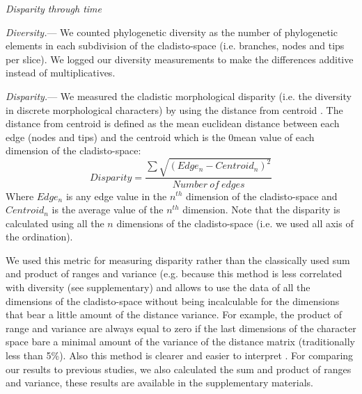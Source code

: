 \documentclass[12pt,letterpaper]{article}
\renewcommand{\subsection}[1]{%
\bigskip
\begin{center}
\begin{large}
\normalfont\itshape #1
\end{large}
\end{center}}
\renewcommand{\subsubsection}[1]{%
\vspace{2ex}
\noindent
\textit{#1.}---}
\begin{document}
\subsection{Disparity through time}
\subsubsection{Diversity}
We counted phylogenetic diversity as the number of phylogenetic elements in each subdivision of the cladisto-space (i.e. branches, nodes and tips per slice). We logged our diversity measurements to make the differences additive instead of multiplicatives.

\subsubsection{Disparity}
We measured the cladistic morphological disparity (i.e. the diversity in discrete morphological characters) by using the distance from centroid \cite{finlay2015morphological}. The distance from centroid is defined as the mean euclidean distance between each edge (nodes and tips) and the centroid which is the 0mean value of each dimension of the cladisto-space:
\begin{equation}
Disparity=\frac{\sum{\sqrt{(Edge_{n}-Centroid_{n})^2}}}{Number\ of\ edges}
\end{equation}
Where $Edge_{n}$ is any edge value in the $n^{th}$ dimension of the cladisto-space and $Centroid_{n}$ is the average value of the $n^{th}$ dimension. Note that the disparity is calculated using all the $n$ dimensions of the cladisto-space (i.e. we used all axis of the ordination).

We used this metric for measuring disparity rather than the classically used sum and product of ranges and variance (e.g. \cite{Wills1994,Foote29111996,Wesley-Hunt2005,Brusatte12092008,ruta2013} %
because this method is less correlated with diversity (see supplementary) and allows to use the data of all the dimensions of the cladisto-space without being incalculable for the dimensions that bear a little amount of the distance variance. For example, the product of range and variance are always equal to zero if the last dimensions of the character space bare a minimal amount of the variance of the distance matrix (traditionally less than 5\%). Also this method is clearer and easier to interpret \cite{finlay2015morphological}. For comparing our results to previous studies, we also calculated the sum and product of ranges and variance, these results are available in the supplementary materials.
\end{document}
